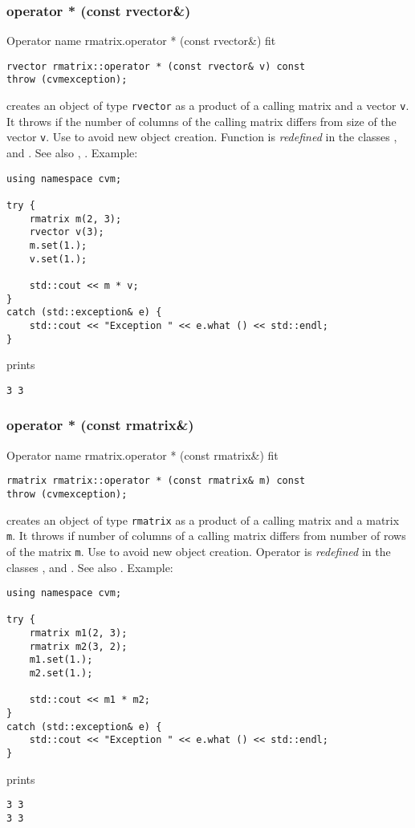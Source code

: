\subsubsection{operator * (const rvector\&)}
Operator%
\pdfdest name {rmatrix.operator * (const rvector&)} fit
\begin{verbatim}
rvector rmatrix::operator * (const rvector& v) const
throw (cvmexception);
\end{verbatim}
creates an object of type \verb"rvector"
as a product of a calling matrix and a vector \verb"v".
It throws  
if the number of columns of the calling matrix
differs from size of the vector \verb"v".
Use 
to avoid new object creation.
Function is \emph{redefined} in the classes
, 
and .
See also
, .
Example:
\begin{Verbatim}
using namespace cvm;

try {
    rmatrix m(2, 3);
    rvector v(3);
    m.set(1.);
    v.set(1.);

    std::cout << m * v;
}
catch (std::exception& e) {
    std::cout << "Exception " << e.what () << std::endl;
}
\end{Verbatim}
prints
\begin{Verbatim}
3 3
\end{Verbatim}
\newpage



\subsubsection{operator * (const rmatrix\&)}
Operator%
\pdfdest name {rmatrix.operator * (const rmatrix&)} fit
\begin{verbatim}
rmatrix rmatrix::operator * (const rmatrix& m) const
throw (cvmexception);
\end{verbatim}
creates an object of type \verb"rmatrix"
as a product of a calling matrix and a matrix \verb"m".
It throws  
if  number of columns of a calling matrix
differs from  number of rows of the matrix \verb"m".
Use  to avoid new object creation.
Operator is \emph{redefined} in the classes
, 
and .
See also
.
Example:
\begin{Verbatim}
using namespace cvm;

try {
    rmatrix m1(2, 3);
    rmatrix m2(3, 2);
    m1.set(1.);
    m2.set(1.);

    std::cout << m1 * m2;
}
catch (std::exception& e) {
    std::cout << "Exception " << e.what () << std::endl;
}
\end{Verbatim}
prints
\begin{Verbatim}
3 3
3 3
\end{Verbatim}
\newpage



